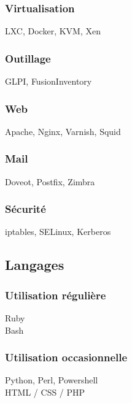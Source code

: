 \documentclass[a4paper]{tsacha-resume}
\begin{document}
\begin{minipage}[t]{0.3\textwidth}
  \subsubsection{Virtualisation}
  LXC, Docker, KVM, Xen

  \subsubsection{Outillage}
  GLPI, FusionInventory

  \subsubsection{Web}
  Apache, Nginx, Varnish, Squid

  \subsubsection{Mail}
  Doveot, Postfix, Zimbra

  \subsubsection{Sécurité}
  iptables, SELinux, Kerberos


  \subsection{Langages}
  \subsubsection{Utilisation régulière}
  Ruby\\
  Bash

  \subsubsection{Utilisation occasionnelle}
  Python, Perl, Powershell\\
  HTML / CSS / PHP

\end{minipage}
\hfill
\end{document}
